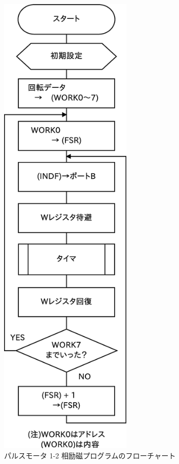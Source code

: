 \documentclass[a4paper,12pt]{ujarticle}
\begin{document}
    \begin{figure}[htbp]
     \begin{center}
      \includegraphics[height=230mm]{Diagram5-12.eps}
     \end{center}
     \caption{パルスモータ 1-2 相励磁プログラムのフローチャート}
     \label{fig:flow_5-12}
    \end{figure}
\end{document}
